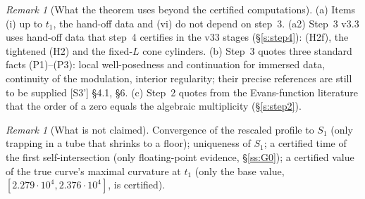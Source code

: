\documentclass[11pt]{amsart}
\theoremstyle{definition}
\theoremstyle{remark}
\newtheorem{remark}[theorem]{Remark}
\newcommand{\dref}[1]{[\textsf{#1}]}
\begin{document}
\begin{remark}[What the theorem uses beyond the certified computations]\label{rem:uses}
(a) Items (i) up to $t_1$, the hand-off data and (vi) do not depend on step~3. (a2) Step~3 v3.3 uses hand-off data that step~4 certifies in the v33 stages (\S\ref{s:step4}): (H2f), the tightened (H2) and the fixed-$L$ cone cylinders. (b) Step~3 quotes three standard facts (P1)--(P3): local well-posedness and continuation for immersed data, continuity of the modulation, interior regularity; their precise references are still to be supplied \dref{S3'} \S4.1, \S6. (c) Step~2 quotes from the Evans-function literature that the order of a zero equals the algebraic multiplicity \cite{AlexanderGardnerJones1990,KapitulaPromislow2013,LatushkinSukhtayev2010} (\S\ref{s:step2}).
\end{remark}

\begin{remark}[What is not claimed]
Convergence of the rescaled profile to $S_1$ (only trapping in a tube that shrinks to a floor); uniqueness of $S_1$; a certified time of the first self-intersection (only floating-point evidence, \S\ref{ss:G0}); a certified value of the true curve's maximal curvature at $t_1$ (only the base value, $[2.279\cdot10^4,2.376\cdot10^4]$, is certified).
\end{remark}
\end{document}
